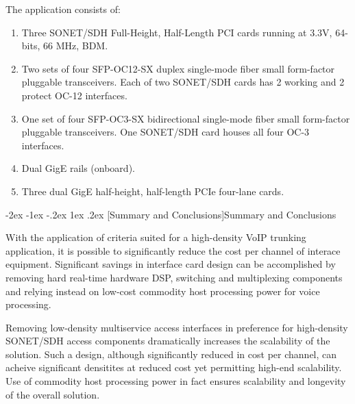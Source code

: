 \documentclass[letterpaper,final,notitlepage,twocolumn,10pt,twoside]{article}
\makeatletter
\let\large = \normalsize
\let\normalsize = \small
\let\small = \footnotesize
\let\footnotesize = \scriptsize
\let\scriptsize = \tiny
\renewcommand\section{\@startsection {section}{1}{\z@}%
                                   {-2ex \@plus -1ex \@minus -.2ex}%
                                   {1ex \@plus .2ex}%
                                   {\normalfont\large\bfseries}}
\makeatother
\begin{document}
The application consists of:

\begin{enumerate}
	\item Three SONET/SDH Full-Height, Half-Length PCI cards running at
		3.3V, 64-bits, 66 MHz, BDM.
	\item Two sets of four SFP-OC12-SX duplex single-mode fiber
		small form-factor pluggable transceivers.  Each of two SONET/SDH
		cards has 2 working and 2 protect OC-12 interfaces.
	\item One set of four SFP-OC3-SX bidirectional single-mode fiber small
		form-factor pluggable transceivers.  One SONET/SDH card houses
		all four OC-3 interfaces.
	\item Dual GigE rails (onboard).
	\item Three dual GigE half-height, half-length PCIe four-lane cards.
\end{enumerate}


\section[Summary and Conclusions]{Summary and Conclusions}

With the application of criteria suited for a high-density VoIP trunking
application, it is possible to significantly reduce the cost per channel of
interace equipment.  Significant savings in interface card design can be
accomplished by removing hard real-time hardware DSP, switching and multiplexing
components and relying instead on low-cost commodity host processing power for
voice processing.

Removing low-density multiservice access interfaces in preference for
high-density SONET/SDH access components dramatically increases the scalability
of the solution.  Such a design, although significantly reduced in cost per
channel, can acheive significant densitites at reduced cost yet permitting
high-end scalability.  Use of commodity host processing power in fact ensures
scalability and longevity of the overall solution.

\FloatBarrier
{}


\end{document}
